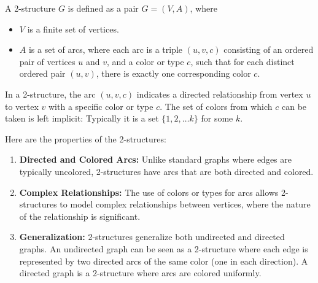 \begin{mydef}
    A 2-structure $G$ is defined as a pair $G = (V, A)$, where
    \begin{itemize}
        \item $V$ is a finite set of vertices.
        \item $A$ is a set of arcs, where each arc is a triple $(u, v, c)$ consisting of an ordered pair of vertices $u$ and $v$, and a color or type $c$, such that for each distinct ordered pair $(u, v)$, there is exactly one corresponding color $c$.
    \end{itemize}
\end{mydef}

In a 2-structure, the arc $(u, v, c)$ indicates a directed relationship from vertex $u$ to vertex $v$ with a specific color or type $c$.
The set of colors from which $c$ can be taken is left implicit: Typically it is a set $\{1, 2, \ldots k\}$ for some $k$.

Here are the properties of the 2-structures:

\begin{enumerate}
    \item \textbf{Directed and Colored Arcs:} Unlike standard graphs where edges are typically uncolored, 2-structures have arcs that are both directed and colored.
    \item \textbf{Complex Relationships:} The use of colors or types for arcs allows 2-structures to model complex relationships between vertices, where the nature of the relationship is significant.
    \item \textbf{Generalization:} 2-structures generalize both undirected and directed graphs.
    An undirected graph can be seen as a 2-structure where each edge is represented by two directed arcs of the same color (one in each direction).
    A directed graph is a 2-structure where arcs are colored uniformly.
\end{enumerate}


